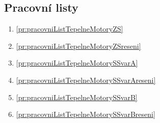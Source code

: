\subsection*{Pracovní listy}
\begin{enumerate}[align=left, labelwidth=0cm, label={Příloha č. -- }\arabic*, resume]
    \item \ref{pr:pracovniListTepelneMotoryZS}
    \item \ref{pr:pracovniListTepelneMotoryZSreseni}
    \item \ref{pr:pracovniListTepelneMotorySSvarA}
    \item \ref{pr:pracovniListTepelneMotorySSvarAreseni}
    \item \ref{pr:pracovniListTepelneMotorySSvarB}
    \item \ref{pr:pracovniListTepelneMotorySSvarBreseni}
\end{enumerate}